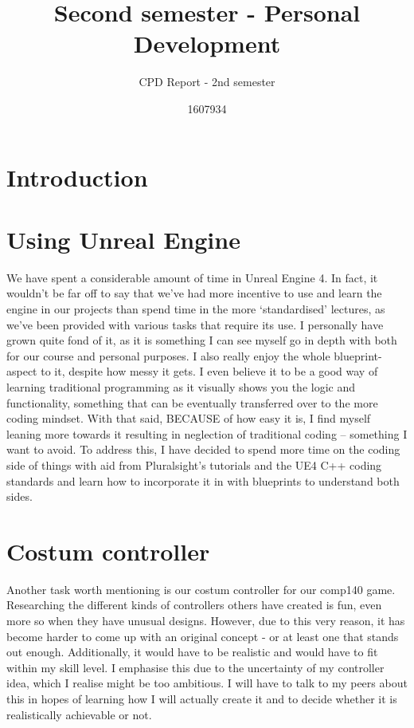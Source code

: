 \documentclass{scrartcl}
\title{Second semester -  Personal Development}
\subtitle{CPD Report - 2nd semester}
\author{1607934}
\begin{document}
\maketitle

\section{Introduction}


\section{Using Unreal Engine}
We have spent a considerable amount of time in Unreal Engine 4. In fact, it wouldn't be far off to say that we've had more incentive to use and learn the engine in our projects than spend time in the more `standardised' lectures, as we've been provided with various tasks that require its use. I personally have grown quite fond of it, as it is something I can see myself go in depth with both for our course and personal purposes. I also really enjoy the whole blueprint-aspect to it, despite how messy it gets. I even believe it to be a good way of learning traditional programming as it visually shows you the logic and functionality, something that can be eventually transferred over to the more coding mindset. With that said, BECAUSE of how easy it is, I find myself leaning more towards it resulting in neglection of traditional coding -- something I want to avoid. To address this, I have decided to spend more time on the coding side of things with aid from Pluralsight's tutorials and the UE4 C++ coding standards and learn how to incorporate it in with blueprints to understand both sides. 

\section{Costum controller}
Another task worth mentioning is our costum controller for our comp140 game. Researching the different kinds of controllers others have created is fun, even more so when they have unusual designs. However, due to this very reason, it has become harder to come up with an original concept - or at least one that stands out enough. Additionally, it would have to be realistic and would have to fit within my skill level. I emphasise this due to the uncertainty of my controller idea, which I realise might be too ambitious. I will have to talk to my peers about this in hopes of learning how I will actually create it and to decide whether it is realistically achievable or not. 
\end{document}
